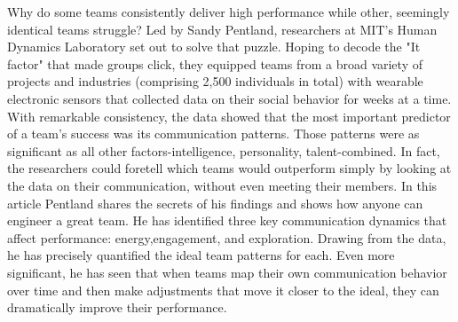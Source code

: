 Why do some teams consistently deliver high performance while other, seemingly identical teams struggle? Led by Sandy Pentland, researchers at {MIT}'s Human Dynamics Laboratory set out to solve that puzzle. Hoping to decode the "It factor" that made groups click, they equipped teams from a broad variety of projects and industries (comprising 2,500 individuals in total) with wearable electronic sensors that collected data on their social behavior for weeks at a time. With remarkable consistency, the data showed that the most important predictor of a team's success was its communication patterns. Those patterns were as significant as all other factors-intelligence, personality, talent-combined. In fact, the researchers could foretell which teams would outperform simply by looking at the data on their communication, without even meeting their members. In this article Pentland shares the secrets of his findings and shows how anyone can engineer a great team. He has identified three key communication dynamics that affect performance: energy,engagement, and exploration. Drawing from the data, he has precisely quantified the ideal team patterns for each. Even more significant, he has seen that when teams map their own communication behavior over time and then make adjustments that move it closer to the ideal, they can dramatically improve their performance.
